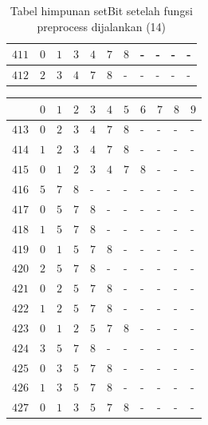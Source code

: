 \begin{appendices}
\begin{table}[H]
\begin{tabular} {|l|l|l|l|l|l|l|l|l|l|l|}
  		$ 411 $ & $ 0 $ &$ 1 $ &$ 3 $ &$ 4 $ &$ 7 $ &$ 8 $ & - &  - &  - &  -   \\ \hline
  		$ 412 $ & $ 2 $ &$ 3 $ &$ 4 $ &$ 7 $ &$ 8 $ & - &  - &  - &  - &  -   \\ \hline  		
  	\end{tabular}\caption{Tabel himpunan setBit setelah fungsi preprocess dijalankan (14)}
  	\label{tab:setbit_14}
  \end{table}
  \begin{table}[H]
  	\centering
  	\begin{tabular} {|l|l|l|l|l|l|l|l|l|l|l|} \hline
  		\backslashbox{$Num$}{$index$} & $ 0 $ & $ 1 $ & $ 2 $ & $ 3 $ & $ 4 $ & $ 5 $ & $ 6 $ & $ 7 $ & $ 8 $ & $ 9 $ \\ \hline
  		$ 413 $ & $ 0 $ &$ 2 $ &$ 3 $ &$ 4 $ &$ 7 $ &$ 8 $ & - &  - &  - &  -   \\ \hline
  		$ 414 $ & $ 1 $ &$ 2 $ &$ 3 $ &$ 4 $ &$ 7 $ &$ 8 $ & - &  - &  - &  -   \\ \hline
  		$ 415 $ & $ 0 $ &$ 1 $ &$ 2 $ &$ 3 $ &$ 4 $ &$ 7 $ &$ 8 $ & - &  - &  -   \\ \hline
  		$ 416 $ & $ 5 $ &$ 7 $ &$ 8 $ & - &  - &  - &  - &  - &  - &  -   \\ \hline
  		$ 417 $ & $ 0 $ &$ 5 $ &$ 7 $ &$ 8 $ & - &  - &  - &  - &  - &  -   \\ \hline
  		$ 418 $ & $ 1 $ &$ 5 $ &$ 7 $ &$ 8 $ & - &  - &  - &  - &  - &  -   \\ \hline
  		$ 419 $ & $ 0 $ &$ 1 $ &$ 5 $ &$ 7 $ &$ 8 $ & - &  - &  - &  - &  -   \\ \hline
  		$ 420 $ & $ 2 $ &$ 5 $ &$ 7 $ &$ 8 $ & - &  - &  - &  - &  - &  -   \\ \hline
  		$ 421 $ & $ 0 $ &$ 2 $ &$ 5 $ &$ 7 $ &$ 8 $ & - &  - &  - &  - &  -   \\ \hline
  		$ 422 $ & $ 1 $ &$ 2 $ &$ 5 $ &$ 7 $ &$ 8 $ & - &  - &  - &  - &  -   \\ \hline
  		$ 423 $ & $ 0 $ &$ 1 $ &$ 2 $ &$ 5 $ &$ 7 $ &$ 8 $ & - &  - &  - &  -   \\ \hline
  		$ 424 $ & $ 3 $ &$ 5 $ &$ 7 $ &$ 8 $ & - &  - &  - &  - &  - &  -   \\ \hline
  		$ 425 $ & $ 0 $ &$ 3 $ &$ 5 $ &$ 7 $ &$ 8 $ & - &  - &  - &  - &  -   \\ \hline
  		$ 426 $ & $ 1 $ &$ 3 $ &$ 5 $ &$ 7 $ &$ 8 $ & - &  - &  - &  - &  -   \\ \hline
  		$ 427 $ & $ 0 $ &$ 1 $ &$ 3 $ &$ 5 $ &$ 7 $ &$ 8 $ & - &  - &  - &  -   \\ \hline

\end{tabular}
\end{table}
\end{appendices}
